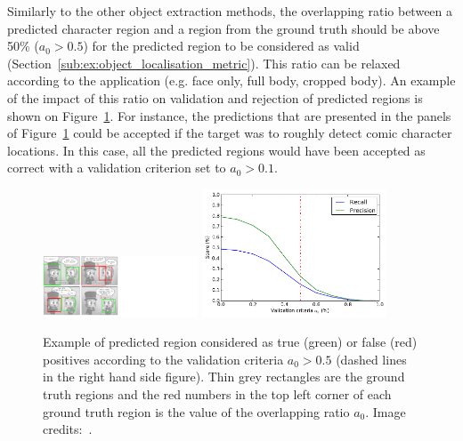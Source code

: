 Similarly to the other object extraction methods, the overlapping ratio between a predicted character region and a region from the ground truth should be above 50\% ($a_0>0.5$) for the predicted region to be considered as valid (Section~\ref{sub:ex:object_localisation_metric}).
This ratio can be relaxed according to the application (e.g. face only, full body, cropped body).
An example of the impact of this ratio on validation and rejection of predicted regions is shown on Figure~\ref{fig:ex:characters_overlap_ratio}.
For instance, the predictions that are presented in the panels of Figure~\ref{fig:ex:characters_overlap_ratio} could be accepted if the target was to roughly detect comic character locations.
In this case, all the predicted regions would have been accepted as correct with a validation criterion set to $a_0>0.1$.




    \begin{figure}[ht]%
      \centering
      \includegraphics[trim= 0mm 0mm 190mm 0mm, clip, width=0.41\textwidth]{characters_overlap_ratio.png}
      \includegraphics[trim= 0mm 0mm 0mm 0mm, clip, width=0.49\textwidth]{overlap_ratio_evolution.pdf}
      \caption[Example of comic character region prediction]{Example of predicted region considered as true (green) or false (red) positives according to the validation criteria $a_0>0.5$ (dashed lines in the right hand side figure). Thin grey rectangles are the ground truth regions and the red numbers in the top left corner of each ground truth region is the value of the overlapping ratio $a_0$. Image credits:~\cite{Magicien11}.}
      \label{fig:ex:characters_overlap_ratio}
    \end{figure}  

